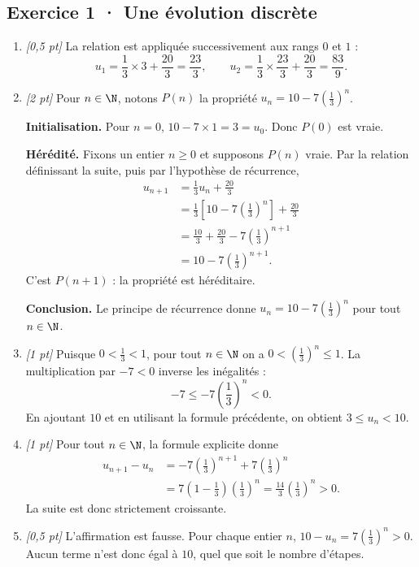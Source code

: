 \subsection*{Exercice 1 · Une évolution discrète}\begin{enumerate}

\item \textit{[0{,}5 pt]} La relation est appliquée successivement aux rangs $0$ et $1$ :\[u_1=\frac{1}{3}\times 3+\frac{20}{3}=\frac{23}{3},\qquad u_2=\frac{1}{3}\times \frac{23}{3}+\frac{20}{3}=\frac{83}{9}.\]

\item \textit{[2 pt]} Pour $n\in\N$, notons $P(n)$ la propriété $u_n=10-7\left(\frac{1}{3}\right)^n$.
\par\smallskip\textbf{Initialisation.} Pour $n=0$, $10-7\times1=3=u_0$. Donc $P(0)$ est vraie.
\par\smallskip\textbf{Hérédité.} Fixons un entier $n\ge0$ et supposons $P(n)$ vraie. Par la relation définissant la suite, puis par l'hypothèse de récurrence,
\[\begin{aligned}u_{n+1}&=\frac{1}{3}u_n+\frac{20}{3}\\
&=\frac{1}{3}\left[10-7\left(\frac{1}{3}\right)^n\right]+\frac{20}{3}\\
&=\frac{10}{3}+\frac{20}{3}-7\left(\frac{1}{3}\right)^{n+1}\\
&=10-7\left(\frac{1}{3}\right)^{n+1}.
\end{aligned}\]
C'est $P(n+1)$ : la propriété est héréditaire.
\par\smallskip\textbf{Conclusion.} Le principe de récurrence donne $u_n=10-7\left(\frac{1}{3}\right)^n$ pour tout $n\in\N$.

\item \textit{[1 pt]} Puisque $0<\frac{1}{3}<1$, pour tout $n\in\N$ on a $0<(\frac{1}{3})^n\le1$. La multiplication par $-7<0$ inverse les inégalités :
\[-7\le-7(\frac{1}{3})^n<0.\]
En ajoutant $10$ et en utilisant la formule précédente, on obtient $3\le u_n<10$.

\item \textit{[1 pt]} Pour tout $n\in\N$, la formule explicite donne
\[\begin{aligned}u_{n+1}-u_n&=-7(\frac{1}{3})^{n+1}+7(\frac{1}{3})^n\\&=7(1-\frac{1}{3})(\frac{1}{3})^n=\frac{14}{3}(\frac{1}{3})^n>0.\end{aligned}\]
La suite est donc strictement croissante.

\item \textit{[0{,}5 pt]} L'affirmation est fausse. Pour chaque entier $n$, $10-u_n=7(\frac{1}{3})^n>0$. Aucun terme n'est donc égal à $10$, quel que soit le nombre d'étapes.

\end{enumerate}

